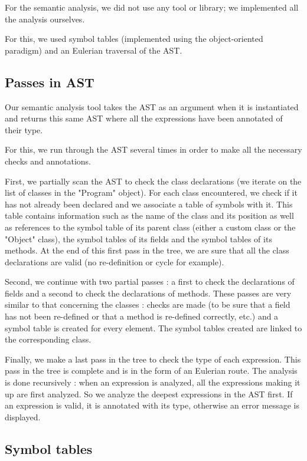 \documentclass[a4paper, 12pt]{article}
\begin{document}
    For the semantic analysis, we did not use any tool or library; we implemented all the analysis ourselves.
    
    For this, we used symbol tables (implemented using the object-oriented paradigm) and an Eulerian traversal of the AST.
    
    \subsection{Passes in AST}
    
    Our semantic analysis tool takes the AST as an argument when it is instantiated and returns this same AST where all the expressions have been annotated of their type.
    
    For this, we run through the AST several times in order to make all the necessary checks and annotations.
    
    First, we partially scan the AST to check the class declarations (we iterate on the list of classes in the "Program" object). For each class encountered, we check if it has not already been declared and we associate a table of symbols with it. This table contains information such as the name of the class and its position as well as references to the symbol table of its parent class (either a custom class or the "Object" class), the symbol tables of its fields and the symbol tables of its methods. At the end of this first pass in the tree, we are sure that all the class declarations are valid (no re-definition or cycle for example).
    
    Second, we continue with two partial passes : a first to check the declarations of fields and a second to check the declarations of methods. These passes are very similar to that concerning the classes : checks are made (to be sure that a field has not been re-defined or that a method is re-defined correctly, etc.) and a symbol table is created for every element. The symbol tables created are linked to the corresponding class.
    
    Finally, we make a last pass in the tree to check the type of each expression. This pass in the tree is complete and is in the form of an Eulerian route. The analysis is done recursively : when an expression is analyzed, all the expressions making it up are first analyzed. So we analyze the deepest expressions in the AST first. If an expression is valid, it is annotated with its type, otherwise an error message is displayed.
    
    \subsection{Symbol tables}
    
\end{document}

